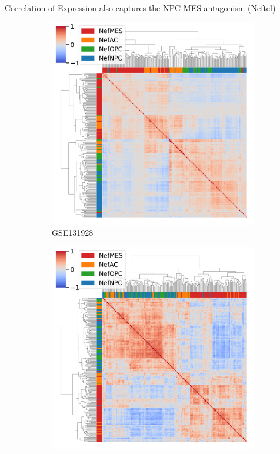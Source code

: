 \documentclass[aspectratio=169,9pt]{beamer}
\begin{document}
    \begin{frame}{Correlation of Expression also captures the NPC-MES antagonism (Neftel)}
        \begin{adjustwidth}{-5cm}{-5cm}
            \centering
            \begin{figure}
                \centering
                \begin{subfigure}[c]{0.48\textwidth}
                    \centering
                    \includegraphics[width=\textwidth]{GSM3828672_Corrplot_Nef}
                    \caption{GSE131928}
                \end{subfigure}
                \begin{subfigure}[c]{0.48\textwidth}
                    \centering
                    \includegraphics[width=\textwidth]{TCGA_Corrplot_Nef}

\end{subfigure}
\end{figure}
\end{adjustwidth}
\end{frame}
\end{document}
